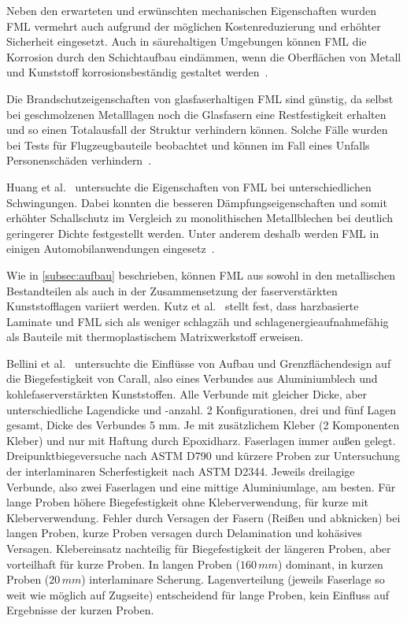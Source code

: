 Neben den erwarteten und erwünschten mechanischen Eigenschaften wurden FML vermehrt auch aufgrund der möglichen Kostenreduzierung und erhöhter Sicherheit eingesetzt.
Auch in säurehaltigen Umgebungen können FML die Korrosion durch den Schichtaufbau eindämmen, wenn die Oberflächen von Metall und Kunststoff korrosionsbeständig gestaltet werden~\cite{Vogelesang2000}.

Die Brandschutzeigenschaften von glasfaserhaltigen FML sind günstig, da selbst bei geschmolzenen Metalllagen noch die Glasfasern eine Restfestigkeit erhalten und so einen Totalausfall der Struktur verhindern können.
Solche Fälle wurden bei Tests für Flugzeugbauteile beobachtet und können im Fall eines Unfalls Personenschäden verhindern~\cite{Vogelesang2000}.

Huang et al.~\cite{Huang1995} untersuchte die Eigenschaften von FML bei unterschiedlichen Schwingungen.
Dabei konnten die besseren Dämpfungseigenschaften und somit erhöhter Schallschutz im Vergleich zu monolithischen Metallblechen bei deutlich geringerer Dichte festgestellt werden.
Unter anderem deshalb werden FML in einigen Automobilanwendungen eingesetz~\cite{Ruokolainen2008}.

Wie in \autoref{subsec:aufbau} beschrieben, können FML aus sowohl in den metallischen Bestandteilen als auch in der Zusammensetzung der faserverstärkten Kunststofflagen variiert werden.
Kutz et al.~\cite{Kutz2017} stellt fest, dass harzbasierte Laminate und FML sich als weniger schlagzäh und schlagenergieaufnahmefähig als Bauteile mit thermoplastischem Matrixwerkstoff erweisen.


Bellini et al.~\cite{Bellini2020} untersuchte die Einflüsse von Aufbau und Grenzflächendesign auf die Biegefestigkeit von Carall, also eines Verbundes aus Aluminiumblech und kohlefaserverstärkten Kunststoffen.
Alle Verbunde mit gleicher Dicke, aber unterschiedliche Lagendicke und -anzahl.
2 Konfigurationen, drei und fünf Lagen gesamt, Dicke des Verbundes 5 mm.
Je mit zusätzlichem Kleber (2 Komponenten Kleber) und nur mit Haftung durch Epoxidharz.
Faserlagen immer außen gelegt.
Dreipunktbiegeversuche nach ASTM D790 und kürzere Proben zur Untersuchung der interlaminaren Scherfestigkeit nach ASTM D2344.
Jeweils dreilagige Verbunde, also zwei Faserlagen und eine mittige Aluminiumlage, am besten.
Für lange Proben höhere Biegefestigkeit ohne Kleberverwendung, für kurze mit Kleberverwendung.
Fehler durch Versagen der Fasern (Reißen und abknicken) bei langen Proben, kurze Proben versagen durch Delamination und kohäsives Versagen.
Klebereinsatz nachteilig für Biegefestigkeit der längeren Proben, aber vorteilhaft für kurze Proben.
In langen Proben ($160\, mm$) dominant, in kurzen Proben ($20\, mm$) interlaminare Scherung.
Lagenverteilung (jeweils Faserlage so weit wie möglich auf Zugseite) entscheidend für lange Proben, kein Einfluss auf Ergebnisse der kurzen Proben.


